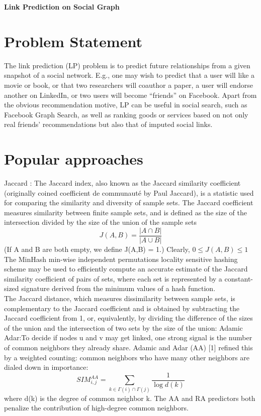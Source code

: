 \clearpage
{}
\begin{center} \huge { \textbf{
     Link Prediction on Social Graph}} 
\end{center}
\clearpage
\section*{Problem Statement}
The link prediction (LP) problem is to predict future relationships from a given snapshot of a social network. E.g., one may wish to predict that a user will like a movie or book, or that two researchers will coauthor a paper, a user will endorse another on LinkedIn, or two users will become “friends” on Facebook. Apart from the obvious recommendation motive, LP can be useful in social search, such as Facebook Graph Search, as well as ranking goods or services based on not only real friends’ recommendations but also that of imputed social links.

\section*{Popular approaches}
Jaccard : The Jaccard index, also known as the Jaccard similarity coefficient (originally coined coefficient de communauté by Paul Jaccard), is a statistic used for comparing the similarity and diversity of sample sets. The Jaccard coefficient measures similarity between finite sample sets, and is defined as the size of the intersection divided by the size of the union of the sample sets
\begin{equation}
J(A,B) = \frac{\left\vert A \cap B \right\vert}{\left\vert A \cup B \right\vert}
\end{equation}
(If A and B are both empty, we define J(A,B) = 1.) Clearly,
$0 \leq J(A,B) \leq 1$
The MinHash min-wise independent permutations locality sensitive hashing scheme may be used to efficiently compute an accurate estimate of the Jaccard similarity coefficient of pairs of sets, where each set is represented by a constant-sized signature derived from the minimum values of a hash function.\\
The Jaccard distance, which measures dissimilarity between sample sets, is complementary to the Jaccard coefficient and is obtained by subtracting the Jaccard coefficient from 1, or, equivalently, by dividing the difference of the sizes of the union and the intersection of two sets by the size of the union:
Adamic Adar:To decide if nodes u and v may get linked, one strong signal is the number of common neighbors they already share. Adamic and Adar (AA) [1] refined this by a weighted counting: common neighbors who have many other neighbors are dialed down in importance:
\begin{equation}
SIM_{i,j}^{AA} = \sum_{k \in \Gamma(i) \cap \Gamma(j)} \frac{1}{\log {d(k)}}
\end{equation}
where d(k) is the degree of common neighbor k. The AA and RA predictors both penalize the contribution of high-degree common neighbors.


